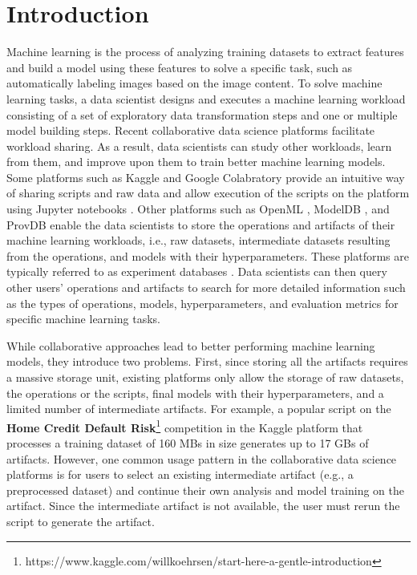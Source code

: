 \section{Introduction} \label{sec-introduction}
Machine learning is the process of analyzing training datasets to extract features and build a model using these features to solve a specific task, such as automatically labeling images based on the image content.
To solve machine learning tasks, a data scientist designs and executes a machine learning workload consisting of a set of exploratory data transformation steps and one or multiple model building steps.
Recent collaborative data science platforms facilitate workload sharing.
As a result, data scientists can study other workloads, learn from them, and improve upon them to train better machine learning models.
Some platforms such as Kaggle \cite{kagglewebsite} and Google Colabratory \cite{googlecolab} provide an intuitive way of sharing scripts and raw data and allow execution of the scripts on the platform using Jupyter notebooks \cite{Kluyver:2016aa}. 
Other platforms such as OpenML \cite{vanschoren2014openml}, ModelDB \cite{vartak2016m}, and ProvDB \cite{miao2018provdb} enable the data scientists to store the operations and artifacts of their machine learning workloads, i.e., raw datasets, intermediate datasets resulting from the operations, and models with their hyperparameters.
These platforms are typically referred to as experiment databases \cite{Vanschoren2012}.
Data scientists can then query other users' operations and artifacts to search for more detailed information such as the types of operations, models, hyperparameters, and evaluation metrics for specific machine learning tasks.

While collaborative approaches lead to better performing machine learning models, they introduce two problems.
First, since storing all the artifacts requires a massive storage unit, existing platforms only allow the storage of raw datasets, the operations or the scripts, final models with their hyperparameters, and a limited number of intermediate artifacts.
For example, a popular script on the \textbf{Home Credit Default Risk}\footnote{https://www.kaggle.com/willkoehrsen/start-here-a-gentle-introduction} competition in the Kaggle platform that processes a training dataset of 160 MBs in size generates up to 17 GBs of artifacts.
However, one common usage pattern in the collaborative data science platforms is for users to select an existing intermediate artifact (e.g., a preprocessed dataset) and continue their own analysis and model training on the artifact. 
Since the intermediate artifact is not available, the user must rerun the script to generate the artifact.


